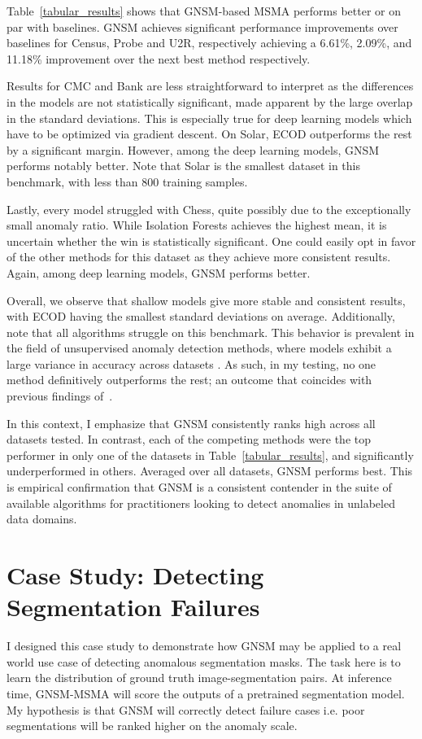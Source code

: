 Table~\ref{tabular_results} shows that GNSM-based MSMA performs better or on par with baselines. GNSM achieves significant performance improvements over baselines for Census, Probe and U2R, respectively achieving a 6.61\%, 2.09\%, and 11.18\% improvement over the next best method respectively.

Results for CMC and Bank are less straightforward to interpret as the differences in the models are not statistically significant, made apparent by the large overlap in the standard deviations. This is especially true for deep learning models which have to be optimized via gradient descent. On Solar, ECOD outperforms the rest by a significant margin. However, among the deep learning models, GNSM performs notably better. Note that Solar is the smallest dataset in this benchmark, with less than 800 training samples.

Lastly, every model struggled with Chess, quite possibly due to the exceptionally small anomaly ratio. While Isolation Forests achieves the highest mean, it is uncertain whether the win is statistically significant. One could easily opt in favor of the other methods for this dataset as they achieve more consistent results. Again, among deep learning models, GNSM performs better.

Overall, we observe that shallow models give more stable and consistent results, with ECOD having the smallest standard deviations on average. Additionally, note that all algorithms struggle on this benchmark. This behavior is prevalent in the field of unsupervised anomaly detection methods, where models exhibit a large variance in accuracy across datasets \cite{han2022adbench}.
As such, in my testing, no one method definitively outperforms the rest; an outcome that coincides with previous findings of~\cite{han2022adbench, pang_deep_2021, ruff_unifying_2021}.

In this context, I emphasize that GNSM consistently ranks high across all datasets tested. In contrast, each of the competing methods were the top performer in only one of the datasets in Table~\ref{tabular_results}, and significantly underperformed in others. Averaged over all datasets, GNSM performs best. This is empirical confirmation that GNSM is a consistent contender in the suite of available algorithms for practitioners looking to detect anomalies in unlabeled data domains.

\section{Case Study: Detecting Segmentation Failures}
\label{cat-seg-study}
I designed this case study to demonstrate how GNSM may be applied to a real world use case of detecting anomalous segmentation masks.
The task here is to learn the distribution of ground truth image-segmentation pairs. At inference time, GNSM-MSMA will score the outputs of a pretrained segmentation model. My hypothesis is that GNSM will correctly detect failure cases i.e. poor segmentations will be ranked higher on the anomaly scale.

